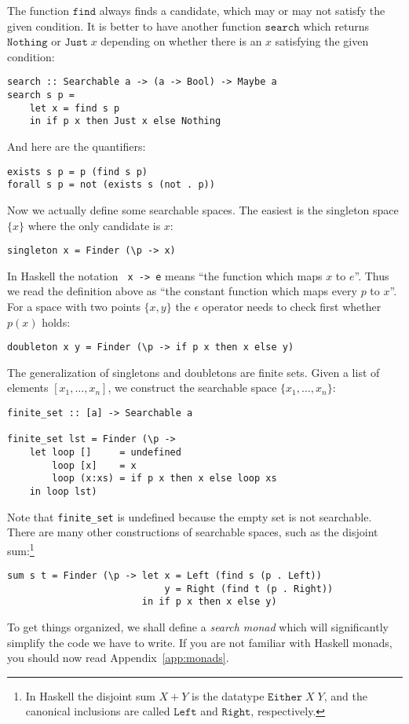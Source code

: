 \documentclass[a4paper,10pt]{article}
\newcommand{\set}[1]{\{#1\}}
\begin{document}
The function $\mathtt{find}$ always finds a candidate, which may or may not
satisfy the given condition. It is better to have another function
$\mathtt{search}$ which returns $\mathtt{Nothing}$ or $\mathtt{Just}\;x$
depending on whether there is an $x$ satisfying the given condition:
% 
\begin{lstlisting}
search :: Searchable a -> (a -> Bool) -> Maybe a
search s p =
    let x = find s p
    in if p x then Just x else Nothing
\end{lstlisting}
% 
And here are the quantifiers:
% 
\begin{lstlisting}
exists s p = p (find s p)
forall s p = not (exists s (not . p))
\end{lstlisting}
% 
Now we actually define some searchable spaces. The easiest is the singleton
space $\set{x}$ where the only candidate is $x$:
% 
\begin{lstlisting}
singleton x = Finder (\p -> x)
\end{lstlisting}
% 
In Haskell the notation \texttt{ x -> e} means ``the function which
maps $x$ to $e$''. Thus we read the definition above as ``the constant
function which maps every $p$ to $x$''.
% 
For a space with two points $\set{x, y}$ the $\epsilon$ operator needs to
check first whether $p(x)$ holds:
% 
\begin{lstlisting}
doubleton x y = Finder (\p -> if p x then x else y)
\end{lstlisting}
% 
The generalization of singletons and doubletons are finite sets. Given a list
of elements $[x_1, \ldots, x_n]$, we construct the searchable space $\set{x_1,
  \ldots, x_n}$:
% 
\begin{lstlisting}
finite_set :: [a] -> Searchable a

finite_set lst = Finder (\p ->
    let loop []     = undefined
        loop [x]    = x
        loop (x:xs) = if p x then x else loop xs
    in loop lst)
\end{lstlisting}
% 
Note that \texttt{finite\_set\;[]} is undefined because the empty set is not
searchable.
% 
There are many other constructions of searchable spaces, such as the disjoint
sum:\footnote{In Haskell the disjoint sum $X + Y$ is the datatype
  $\mathtt{Either}\;X\;Y$, and the canonical inclusions are called
  $\mathtt{Left}$ and $\mathtt{Right}$, respectively.}
% 
\begin{lstlisting}
sum s t = Finder (\p -> let x = Left (find s (p . Left))
                            y = Right (find t (p . Right))
                        in if p x then x else y)
\end{lstlisting}
% 
To get things organized, we shall define a \emph{search monad} which will
significantly simplify the code we have to write. If you are not familiar with
Haskell monads, you should now read Appendix~\ref{app:monads}.
\end{document}
